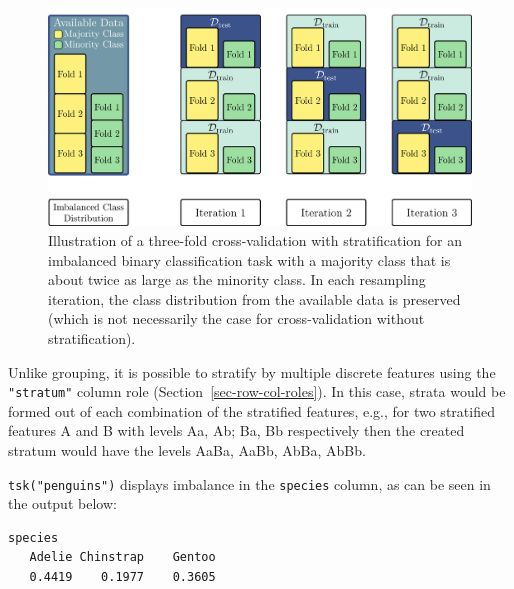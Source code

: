 \begin{figure}

{\centering \includegraphics[width=1\textwidth,height=\textheight]{chapters/chapter3/Figures/mlr3book_figures-8.png}

}

\caption{\label{fig-stratification}Illustration of a three-fold
cross-validation with stratification for an imbalanced binary
classification task with a majority class that is about twice as large
as the minority class. In each resampling iteration, the class
distribution from the available data is preserved (which is not
necessarily the case for cross-validation without stratification).}

\end{figure}

Unlike grouping, it is possible to stratify by multiple discrete
features using the \texttt{"stratum"} column role
(Section~\ref{sec-row-col-roles}). In this case, strata would be formed
out of each combination of the stratified features, e.g., for two
stratified features A and B with levels Aa, Ab; Ba, Bb respectively then
the created stratum would have the levels AaBa, AaBb, AbBa, AbBb.

\texttt{tsk("penguins")} displays imbalance in the \texttt{species}
column, as can be seen in the output below:

\begin{Shaded}
\begin{Highlighting}[]
\NormalTok{(}\SpecialCharTok{$}\NormalTok{(} \NormalTok{)))}
\end{Highlighting}
\end{Shaded}

\begin{verbatim}
species
   Adelie Chinstrap    Gentoo 
   0.4419    0.1977    0.3605 
\end{verbatim}

